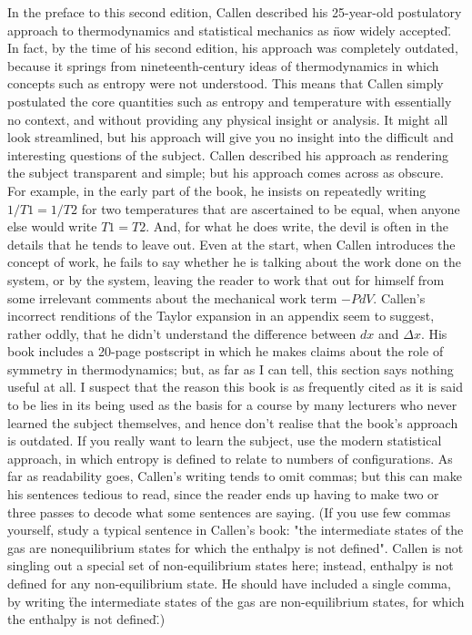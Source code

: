 \documentclass[10pt,a4paper]{book}
\theoremstyle{definition}
\begin{document}
\begin{itemize}
In the preface to this second edition, Callen described his 25-year-old postulatory approach to thermodynamics and statistical mechanics as \"now widely accepted\".  In fact, by the time of his second edition, his approach was completely outdated, because it springs from nineteenth-century ideas of thermodynamics in which concepts such as entropy were not understood.  This means that Callen simply postulated the core quantities such as entropy and temperature with essentially no context, and without providing any physical insight or analysis.  It might all look streamlined, but his approach will give you no insight into the difficult and interesting questions of the subject.  Callen described his approach as rendering the subject transparent and simple; but his approach comes across as obscure.  
For example, in the early part of the book, he insists on repeatedly writing $1/T1=1/T2$ for two temperatures that are ascertained to be equal, when anyone else would write $T1=T2$.  And, for what he does write, the devil is often in the details that he tends to leave out.  Even at the start, when Callen introduces the concept of work, he fails to say whether he is talking about the work done on the system, or by the system, leaving the reader to work that out for himself from some irrelevant comments about the mechanical work term $-P dV$. 
Callen's incorrect renditions of the Taylor expansion in an appendix seem to suggest, rather oddly, that he didn't understand the difference between $dx$ and $\Delta x$.  His book includes a 20-page postscript in which he makes claims about the role of symmetry in thermodynamics; but, as far as I can tell, this section says nothing useful at all.  I suspect that the reason this book is as frequently cited as it is said to be lies in its being used as the basis for a course by many lecturers who never learned the subject themselves, and hence don't realise that the book's approach is outdated.  If you really want to learn the subject, use the modern statistical approach, in which entropy is defined to relate to numbers of configurations.  As far as readability goes, Callen's writing tends to omit commas; but this can make his sentences tedious to read, since the reader ends up having to make two or three passes to decode what some sentences are saying.  (If you use few commas yourself, study a typical sentence in Callen's book: "the intermediate states of the gas are nonequilibrium states for which the enthalpy is not defined".  Callen is not singling out a special set of non-equilibrium states here; instead, enthalpy is not defined for any non-equilibrium state.  He should have included a single comma, by writing \"the intermediate states of the gas are non-equilibrium states, for which the enthalpy is not defined\".)


\end{itemize}
\end{document}
